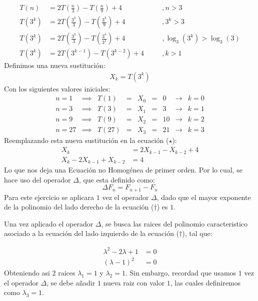 \begin{solution}
  \begin{align*}
      T(n) &= 2T\left(\frac{n}{3}\right) - T\left(\frac{n}{9}\right) + 4 &\quad&, n > 3\\
      T(3^k) &= 2T\left(\frac{3^k}{3}\right) - T\left(\frac{3^k}{9}\right) +4 &\quad&, 3^k > 3\\
      T(3^k) &= 2T\left(\frac{3^k}{3}\right) - T\left(\frac{3^k}{3^2}\right) +4 &\quad&, \log_3 (3^k) > \log_3 (3)\\
      T(3^k) &= 2T\left(3^{k-1}\right) - T\left(3^{k-2}\right) +4 &\quad&, k > 1 \tag{$\star$}
  \end{align*}
  Definimos una nueva sustitución:
  \begin{align*}
      X_k = T\left(3^k\right)
  \end{align*}
  Con los siguientes valores iniciales:
  $$
  \left.
    \begin{array}{rcrrrrlcr}
      n=1 &\implies& T(1)&=&X_0&=&0 &\rightarrow& k=0\\
      n=3 &\implies& T(3)&=&X_1&=&3 &\rightarrow& k=1\\
      n=9 &\implies& T(9)&=&X_2&=&10 &\rightarrow& k=2\\
      n=27 &\implies& T(27)&=&X_3&=&21 &\rightarrow& k=3
    \end{array}
  \right.
  $$
  Reemplazando esta nueva sustitución en la ecuación ($\star$):
  \begin{align*}
      X_k &= 2X_{k-1} -X_{k-2} + 4 \\
      X_k - 2X_{k-1} + X_{k-2} &= 4 \tag{$\dagger$}
  \end{align*}
  Lo que nos deja una Ecuación no Homogénea de primer orden. Por lo cual,  se hace uso del operador $\Delta$, que esta definido como:
$$\Delta F_n = F_{n+1} - F_n$$
Para este ejercicio se aplicara $1$ vez el operador $\Delta$, dado que el mayor exponente de la polinomio del lado derecho de la ecuación ($\dagger$) es $1$.

Una vez aplicado el operador $\Delta$, se busca las raices del polinomio caracteristico asociado a la ecuación  del lado izquierdo de la ecuación ($\dagger$), tal que:

\begin{align*}
    \lambda^2 - 2\lambda + 1  &= 0\\
    (\lambda - 1)^2  &= 0
\end{align*}
Obteniendo asi $2$ raices $\lambda_1 = 1$ y $\lambda_2=1$. Sin embargo, recordad que usamos $1$ vez el operador $\Delta$, se debe añadir $1$ nueva raiz con valor $1$, las cuales definiremos como $\lambda_3 =1$.


\end{solution}
